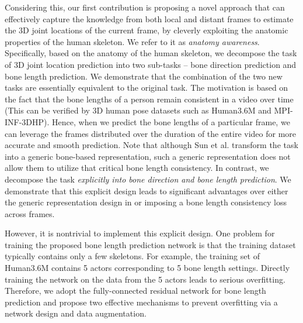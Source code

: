 \documentclass[journal]{IEEEtran}
\begin{document}
\vspace{-1mm}



Considering this, our first contribution is proposing a novel approach that can effectively capture the knowledge from both local and distant frames to estimate the 3D joint locations of the current frame, by cleverly exploiting the anatomic properties of the human skeleton. We refer to it as \emph{anatomy awareness}.  Specifically, based on the anatomy of the human skeleton, we decompose the task of 3D joint location prediction into two sub-tasks -- bone direction prediction and bone length prediction. We demonstrate that the combination of the two new tasks are essentially equivalent to the original task. The motivation is based on the fact that the bone lengths of a person remain consistent in a video over time (This can be verified by 3D human pose datasets such as Human3.6M and MPI-INF-3DHP). Hence, when we predict the bone lengths of a particular frame, we can leverage the frames distributed over the duration of the entire video for more accurate and smooth prediction. Note that although Sun et al. \cite{sun2017compositional} transform the task into a generic bone-based representation, such a generic representation does not allow them to utilize that critical bone length consistency.
In contrast, we decompose the task {\it explicitly into bone direction and bone length prediction}. We demonstrate that this explicit design leads to significant advantages over either the generic representation design in \cite{sun2017compositional} or imposing a bone length consistency loss across frames. 

However, it is nontrivial to implement this explicit design. One problem for training the proposed bone length prediction network is that the training dataset typically contains only a few skeletons. For example, the training set of Human3.6M contains 5 actors corresponding to 5 bone length settings. Directly training the network on the data from the 5 actors leads to serious overfitting. Therefore, we adopt the fully-connected residual network for bone length prediction and propose two effective mechanisms to prevent overfitting via a network design and data augmentation. 
\end{document}
